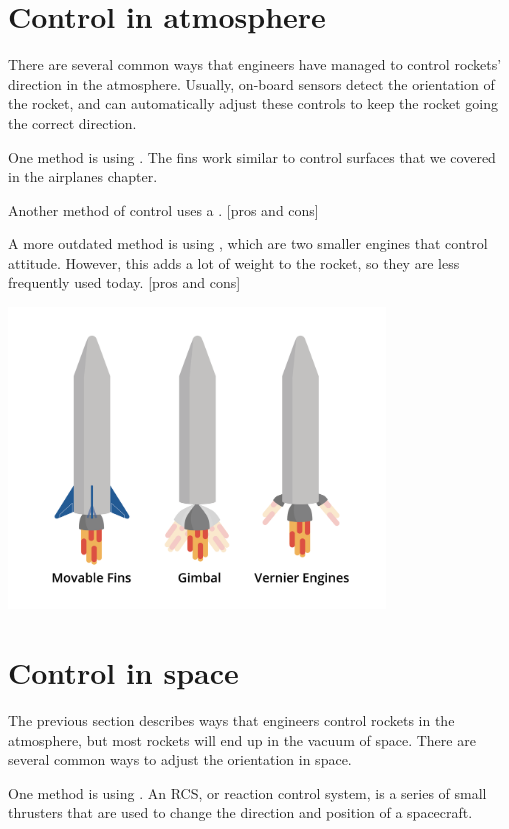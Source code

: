\section{Control in atmosphere}

There are several common ways that engineers have managed to control rockets' direction in the atmosphere. Usually, on-board sensors detect the orientation of the rocket, and can automatically adjust these controls to keep the rocket going the correct direction.

	
	One method is using . The fins work similar to control surfaces that we covered in the airplanes chapter. 



	Another method of control uses a . [pros and cons]
	
	A more outdated method is using , which are two smaller engines that control attitude. However, this adds a lot of weight to the rocket, so they are less frequently used today. [pros and cons]


\includegraphics[width=0.75\textwidth]{control.png}


\section{Control in space}

The previous section describes ways that engineers control rockets in the atmosphere, but most rockets will end up in the vacuum of space. There are several common ways to adjust the orientation in space.

	One method is using . An RCS, or reaction control system, is a series of small thrusters that are used to change the direction and position of a spacecraft. 

